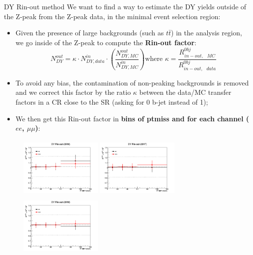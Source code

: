 \documentclass[8pt]{beamer}
\begin{document}
\begin{frame}{DY Rin-out method}
\justifying
We want to find a way to \alert{estimate the DY yields outside of the Z-peak from the Z-peak data}, in the minimal event selection region:

\begin{itemize}
\justifying
\item Given the presence of large backgrounds (such as $t \bar t$) in the analysis region, we go inside of the Z-peak to compute the \textbf{Rin-out factor}:
\begin{equation*}
N^{out}_{DY} = \kappa \cdot N^{in}_{DY, data} \cdot \left (\frac{N^{out}_{DY, MC}}{N^{in}_{DY, MC}} \right ) \text{where } \kappa = \frac{R_{in-out,\text{ } MC}^{0bj}}{R_{in-out,\text{ } data}^{0bj}}
\end{equation*}
\item To avoid any bias, the contamination of non-peaking backgrounds is removed and we correct this factor by the ratio $\kappa$ between the data/MC transfer factors in a CR close to the SR (asking for 0 b-jet instead of 1);
\item We then get this Rin-out factor in \textbf{bins of ptmiss and for each channel ($ee$, $\mu \mu$)}:
\end{itemize}

\begin{figure}[htbp]
\begin{center}
\begin{minipage}[b]{.32\textwidth}
\includegraphics[width=4cm, height=3cm]{figs/Rinout2016_data.png}
\end{minipage} \hfill
\begin{minipage}[b]{.32\textwidth}
\includegraphics[width=4cm, height=3cm]{figs/Rinout2017_data.png}
\end{minipage} \hfill
\begin{minipage}[b]{.32\textwidth}
\includegraphics[width=4cm, height=3cm]{figs/Rinout2018_data.png}
\end{minipage} \hfill
\end{center}
\end{figure} \vfill


\end{frame}
\end{document}
